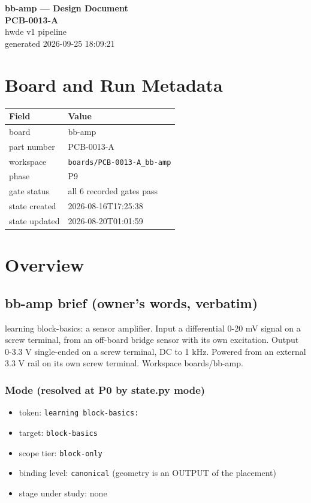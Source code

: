 \documentclass[11pt,a4paper]{article}
\begin{document}
\sloppy
\begin{center}
{\LARGE\bfseries bb-amp --- Design Document}\\[6pt]
{\Large\bfseries PCB-0013-A}\\[6pt]
{\large hwde v1 pipeline}\\[2pt]
generated 2026-09-25 18:09:21
\end{center}
\tableofcontents

\section{Board and Run Metadata}
{\small
\begin{longtable}{lp{11cm}}
\toprule
\textbf{Field} & \textbf{Value} \\
\midrule
\endhead
board & bb-amp \\
part number & PCB-0013-A \\
workspace & \texttt{boards/PCB-0013-A\_bb-amp} \\
phase & P9 \\
gate status & all 6 recorded gates pass \\
state created & 2026-08-16T17:25:38 \\
state updated & 2026-08-20T01:01:59 \\
\bottomrule
\end{longtable}
}
\section{Overview}
\subsection*{bb-amp brief (owner's words, verbatim)}
learning block-basics: a sensor amplifier. Input a differential 0-20 mV signal on a screw terminal, from an off-board bridge sensor with its own excitation. Output 0-3.3 V single-ended on a screw terminal, DC to 1 kHz. Powered from an external 3.3 V rail on its own screw terminal. Workspace boards/bb-amp.

\subsubsection*{Mode (resolved at P0 by state.py mode)}
\begin{itemize}
\item token: \texttt{learning block-basics:}
\item target: \texttt{block-basics}
\item scope tier: \texttt{block-only}
\item binding level: \texttt{canonical} (geometry is an OUTPUT of the placement)
\item stage under study: none
\end{itemize}
\end{document}
